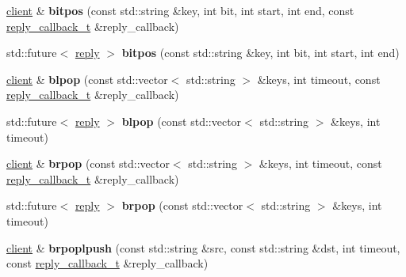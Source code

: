 \begin{DoxyCompactItemize}
\hyperlink{classcpp__redis_1_1client}{client} \& {\bfseries bitpos} (const std\+::string \&key, int bit, int start, int end, const \hyperlink{classcpp__redis_1_1client_a061a1140d36d2eaeda82b09a0bb3f9f2}{reply\+\_\+callback\+\_\+t} \&reply\+\_\+callback)
\item 
\mbox{\label{classcpp__redis_1_1client_a43b5121105276ccae731bb6093c80e02}} 
std\+::future$<$ \hyperlink{classcpp__redis_1_1reply}{reply} $>$ {\bfseries bitpos} (const std\+::string \&key, int bit, int start, int end)
\item 
\mbox{\label{classcpp__redis_1_1client_a432c2677b13dc8e2a9d7afe7eade39e3}} 
\hyperlink{classcpp__redis_1_1client}{client} \& {\bfseries blpop} (const std\+::vector$<$ std\+::string $>$ \&keys, int timeout, const \hyperlink{classcpp__redis_1_1client_a061a1140d36d2eaeda82b09a0bb3f9f2}{reply\+\_\+callback\+\_\+t} \&reply\+\_\+callback)
\item 
\mbox{\label{classcpp__redis_1_1client_ac54c987bca4efb4bf6659b063f19d5ff}} 
std\+::future$<$ \hyperlink{classcpp__redis_1_1reply}{reply} $>$ {\bfseries blpop} (const std\+::vector$<$ std\+::string $>$ \&keys, int timeout)
\item 
\mbox{\label{classcpp__redis_1_1client_adc565332168e31ebbd762f2cb12ad4d1}} 
\hyperlink{classcpp__redis_1_1client}{client} \& {\bfseries brpop} (const std\+::vector$<$ std\+::string $>$ \&keys, int timeout, const \hyperlink{classcpp__redis_1_1client_a061a1140d36d2eaeda82b09a0bb3f9f2}{reply\+\_\+callback\+\_\+t} \&reply\+\_\+callback)
\item 
\mbox{\label{classcpp__redis_1_1client_aa123b931c6d00027d08f0fcbde2f026e}} 
std\+::future$<$ \hyperlink{classcpp__redis_1_1reply}{reply} $>$ {\bfseries brpop} (const std\+::vector$<$ std\+::string $>$ \&keys, int timeout)
\item 
\mbox{\label{classcpp__redis_1_1client_afa7fb97bb0b30c2c78a605f48b6144e2}} 
\hyperlink{classcpp__redis_1_1client}{client} \& {\bfseries brpoplpush} (const std\+::string \&src, const std\+::string \&dst, int timeout, const \hyperlink{classcpp__redis_1_1client_a061a1140d36d2eaeda82b09a0bb3f9f2}{reply\+\_\+callback\+\_\+t} \&reply\+\_\+callback)

\end{DoxyCompactItemize}
